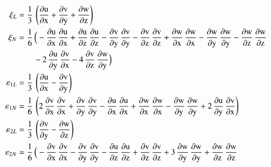 \begin{subequations}
	\begin{align}
	\mathrm \xi_{L} & = \frac{1}{3} \, \left(\mathrm{\frac{\partial u}{\partial x}} + \mathrm{\frac{\partial v}{\partial y}} + \mathrm{\frac{\partial w}{\partial z}}\right)\\
	\mathrm \xi_{N} & = \frac{1}{6} \, \Big(-\mathrm{\frac{\partial u}{\partial x}}\, \mathrm{\frac{\partial u}{\partial x}} + \mathrm{\frac{\partial u}{\partial z}}\, \mathrm{\frac{\partial u}{\partial z}}  - \mathrm{\frac{ \partial v}{\partial y}}\, \mathrm{\frac{ \partial v}{\partial y}} - \mathrm{\frac{\partial v}{\partial z}}\, \mathrm{\frac{\partial v}{\partial z}} + \mathrm{\frac{\partial w}{\partial x}}\, \mathrm{\frac{\partial w}{\partial x}} - \mathrm{\frac{\partial w}{\partial y}}\, \mathrm{\frac{\partial w}{\partial y}} - \mathrm{\frac{\partial w}{\partial z}}\, \mathrm{\frac{\partial w}{\partial z}} 
	\notag \\
	\mbox{} & \qquad - 2 \, \mathrm{\frac{\partial u}{\partial y}}\, \mathrm{\frac{\partial v}{\partial x}} - 4 \, \mathrm{\frac{\partial v}{\partial z}}\, \mathrm{\frac{\partial w}{\partial y}} \Big)\\
	\mathrm \varepsilon_{1L} & = \frac{1}{3} \, \left(\mathrm{\frac{\partial u}{\partial x}} - \mathrm{\frac{\partial v}{\partial y}}\right)\\
	\mathrm \varepsilon_{1N} & = \frac{1}{6} \, \left(2 \, \mathrm{\frac{\partial v}{\partial x}}\, \mathrm{\frac{\partial v}{\partial x}} + \mathrm{\frac{ \partial v}{\partial y}}\, \mathrm{\frac{ \partial v}{\partial y}} - \mathrm{\frac{\partial u}{\partial x}}\, \mathrm{\frac{\partial u}{\partial x}} +  \mathrm{\frac{\partial w}{\partial x}}\, \mathrm{\frac{\partial w}{\partial x}} -  \mathrm{\frac{\partial w}{\partial y}}\, \mathrm{\frac{\partial w}{\partial y}} + 2 \, \mathrm{\frac{\partial u}{\partial y}}\, \mathrm{\frac{\partial v}{\partial x}}\right)\\
	\mathrm \varepsilon_{2L} & = \frac{1}{3} \, \left(\mathrm{\frac{\partial v}{\partial y}} - \mathrm{\frac{\partial w}{\partial z}}\right)\\
	\mathrm \varepsilon_{2N} & = \frac{1}{6} \, \Big(- \mathrm{\frac{\partial v}{\partial x}}\, \mathrm{\frac{\partial v}{\partial x}} - \mathrm{\frac{ \partial v}{\partial y}}\, \mathrm{\frac{ \partial v}{\partial y}} - \mathrm{\frac{\partial u}{\partial z}}\, \mathrm{\frac{\partial u}{\partial z}} + \mathrm{\frac{\partial v}{\partial z}}\, \mathrm{\frac{\partial v}{\partial z}} + 3 \,  \mathrm{\frac{\partial w}{\partial y}}\, \mathrm{\frac{\partial w}{\partial y}} +  \mathrm{\frac{\partial w}{\partial z}}\, \mathrm{\frac{\partial w}{\partial z}}  \notag \\

\end{align}
\end{subequations}
